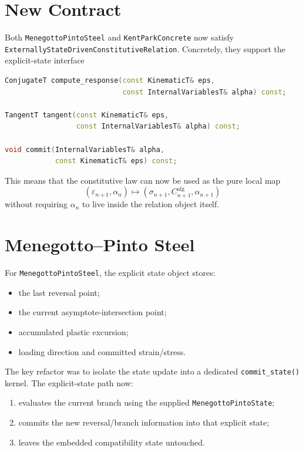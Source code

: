 \section{New Contract}

Both \texttt{MenegottoPintoSteel} and \texttt{KentParkConcrete} now satisfy
\texttt{ExternallyStateDrivenConstitutiveRelation}.  Concretely, they support
the explicit-state interface

\begin{lstlisting}[language=C++]
ConjugateT compute_response(const KinematicT& eps,
                            const InternalVariablesT& alpha) const;

TangentT tangent(const KinematicT& eps,
                 const InternalVariablesT& alpha) const;

void commit(InternalVariablesT& alpha,
            const KinematicT& eps) const;
\end{lstlisting}

This means that the constitutive law can now be used as the pure local map
\[
(\varepsilon_{n+1}, \alpha_n)
\mapsto
(\sigma_{n+1}, C_{n+1}^{\text{alg}}, \alpha_{n+1})
\]
without requiring \(\alpha_n\) to live inside the relation object itself.

\section{Menegotto--Pinto Steel}

For \texttt{MenegottoPintoSteel}, the explicit state object stores:

\begin{itemize}
  \item the last reversal point;
  \item the current asymptote-intersection point;
  \item accumulated plastic excursion;
  \item loading direction and committed strain/stress.
\end{itemize}

The key refactor was to isolate the state update into a dedicated
\texttt{commit\_state()} kernel.  The explicit-state path now:

\begin{enumerate}
  \item evaluates the current branch using the supplied
        \texttt{MenegottoPintoState};
  \item commits the new reversal/branch information into that explicit state;
  \item leaves the embedded compatibility state untouched.
\end{enumerate}

